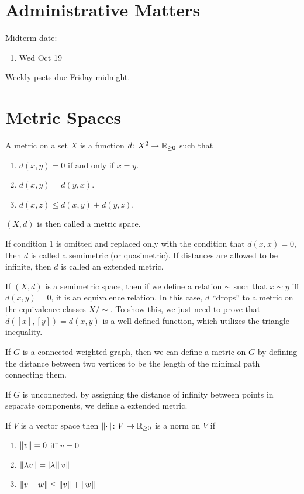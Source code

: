 \chapter*{Administrative Matters}
Midterm date:
\begin{enumerate}
    \item Wed Oct 19
\end{enumerate}

Weekly psets due Friday midnight.

\chapter{Metric Spaces}

\begin{definition}
    A metric on a set $X$ is a function $d\colon X^2 \to \mathbb R_{\ge 0}$ such that
    \begin{enumerate}
        \item $d(x, y) = 0$ if and only if $x = y$.
        \item $d(x, y) = d(y, x)$.
        \item $d(x, z) \le d(x, y) + d(y, z)$.
    \end{enumerate}

    $(X, d)$ is then called a metric space.
\end{definition}

If condition 1 is omitted and replaced only with the condition that $d(x, x) = 0$, then $d$ is called a semimetric (or quasimetric). If distances are allowed to be infinite, then $d$ is called an extended metric.

If $(X, d)$ is a semimetric space, then if we define a relation $\sim$ such that $x \sim y$ iff $d(x, y) = 0$, it is an equivalence relation. In this case, $d$ ``drops'' to a metric on the equivalence classes $X/\!\sim$. To show this, we just need to prove that $\tilde d([x], [y]) = d(x, y)$ is a well-defined function, which utilizes the triangle inequality.

\begin{example}
    If $G$ is a connected weighted graph, then we can define a metric on $G$ by defining the distance between two vertices to be the length of the minimal path connecting them.

    If $G$ is unconnected, by assigning the distance of infinity between points in separate components, we define a extended metric.
\end{example}

\begin{definition}[Norm]
    If $V$ is a vector space then $\norm{\cdot}\colon V \to \mathbb R_{\ge 0}$ is a norm on $V$ if 
    \begin{enumerate}
        \item $\norm{v} = 0$ iff $v = 0$
        \item $\norm{\lambda v} = \abs{\lambda}\norm{v}$
        \item $\norm{v + w} \le \norm{v} + \norm{w}$
    \end{enumerate}
\end{definition}

